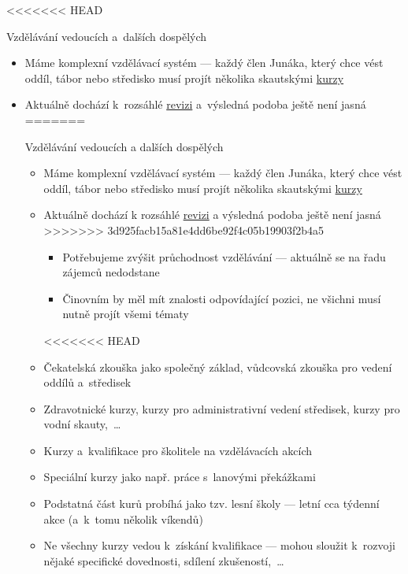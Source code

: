 \documentclass[compress, xelatex, 11pt, xcolor=dvipsnames, aspectratio=169, url={hyphens, lowtilde}]{beamer}
\begin{document}
<<<<<<< HEAD
\begin{frame}[allowframebreaks]{Vzdělávání vedoucích a~dalších dospělých}
	\begin{itemize}
		\item Máme komplexní vzdělávací systém --- každý člen Junáka, který chce vést oddíl, tábor nebo středisko musí projít několika skautskými \href{https://krizovatka.skaut.cz/vzdelavani/chci-se-vzdelavat/jet-na-vzdelavaci-akci/typy-vzdelavacich-akci/kvalifikacni-akce}{kurzy}
		\item Aktuálně dochází k~rozsáhlé \href{https://krizovatka.skaut.cz/vzdelavani/promena-skautskeho-vzdelavani}{revizi} a~výsledná podoba ještě není jasná
=======
\begin{frame}[allowframebreaks]{Vzdělávání vedoucích a dalších dospělých}
	\begin{itemize}
		\item Máme komplexní vzdělávací systém --- každý člen Junáka, který chce vést oddíl, tábor nebo středisko musí projít několika skautskými \href{https://krizovatka.skaut.cz/vzdelavani/chci-se-vzdelavat/jet-na-vzdelavaci-akci/typy-vzdelavacich-akci/kvalifikacni-akce}{kurzy}
		\item Aktuálně dochází k rozsáhlé \href{https://krizovatka.skaut.cz/vzdelavani/promena-skautskeho-vzdelavani}{revizi} a výsledná podoba ještě není jasná
>>>>>>> 3d925facb15a81e4dd6be92f4c05b19903f2b4a5
		\begin{itemize}
			\item Potřebujeme zvýšit průchodnost vzdělávání --- aktuálně se na řadu zájemců nedodstane
			\item Činovním by měl mít znalosti odpovídající pozici, ne všichni musí nutně projít všemi tématy
		\end{itemize}
<<<<<<< HEAD
		\item Čekatelská zkouška jako společný základ, vůdcovská zkouška pro vedení oddílů a~středisek
		\item Zdravotnické kurzy, kurzy pro administrativní vedení středisek, kurzy pro vodní skauty,~\ldots
		\item Kurzy a~kvalifikace pro školitele na vzdělávacích akcích
		\item Speciální kurzy jako např. práce s~lanovými překážkami
		\item Podstatná část kurů probíhá jako tzv. lesní školy --- letní cca týdenní akce (a~k~tomu několik víkendů)
		\item Ne všechny kurzy vedou k~získání kvalifikace --- mohou sloužit k~rozvoji nějaké specifické dovednosti, sdílení zkušeností,~\ldots

\end{itemize}
\end{frame}
\end{itemize}
\end{frame}
\end{document}
